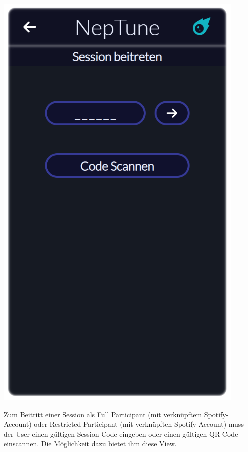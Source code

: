 \documentclass[oneside, ngerman]{sdqtechreport}
\begin{document}
\begin{minipage}{0.5\textwidth}
    \hypertarget{joinSessionView}{}
    \includegraphics[width=0.9\textwidth]{LATEX/Pflichtenheft/GraphicDesigns/userJoinGroupPage.png}
\end{minipage} 
\hfill
\begin{minipage}{0.5\textwidth}
    Zum Beitritt einer Session als Full Participant (mit verknüpftem Spotify-Account) oder Restricted Participant (mit verknüpften Spotify-Account) muss der User einen gültigen Session-Code eingeben oder einen gültigen QR-Code einscannen. Die Möglichkeit dazu bietet ihm diese View.
\end{minipage}
\vspace{\baselineskip}
\end{document}
